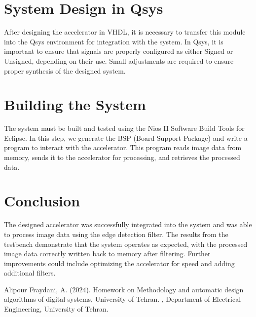 \documentclass[DIV=calc, paper=a4, fontsize=11pt, twocolumn]{scrartcl}	 %
\begin{document}

\section*{\small{System Design in Qsys}}


After designing the accelerator in VHDL, it is necessary to transfer this 
module into the Qsys environment for integration with the system. In Qsys, 
it is important to ensure that signals are properly configured as either Signed or Unsigned, 
depending on their use. Small adjustments are required to ensure proper synthesis of the 
designed system.

\section*{\small{Building the System}}


The system must be built and tested using the Nios II Software Build Tools for Eclipse. 
In this step, we generate the BSP (Board Support Package) and write a program to interact 
with the accelerator. This program reads image data from memory, sends it to the accelerator 
for processing, and retrieves the processed data.

\section*{\small{Conclusion}}


The designed accelerator was successfully integrated into the system and was able to process image 
data using the edge detection filter. The results from the testbench demonstrate that the system 
operates as expected, with the processed image data correctly written back to memory after filtering. 
Further improvements could include optimizing the accelerator for speed and adding additional filters.


\begin{thebibliography}{99} %

  Alipour Fraydani, A. (2024).
  \newblock Homework on Methodology and automatic design algorithms of digital systems, University of Tehran.
  , Department of Electrical Engineering, University of Tehran.
  
\end{thebibliography}

\end{document}
